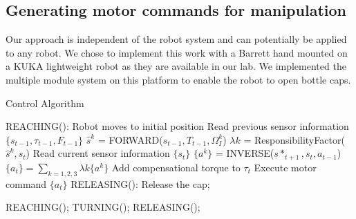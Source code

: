 

\subsection{Generating motor commands for manipulation}
\label{cha4:sec3:command}
Our approach is independent of the robot system and can potentially be applied to any robot. We chose to implement this work with a Barrett hand mounted on a KUKA lightweight robot as they are available in our lab. We implemented the multiple module system on this platform to enable the robot to open bottle caps.

\begin{algorithm}
  \caption{Control Algorithm}
  \begin{algorithmic}[1]
    \State REACHING(): Robot moves to initial position\;
          \State Read previous sensor information $\{s_{t-1},\tau_{t-1},F_{t-1}\}$\;
            \State $\hat{s}^{k}$ = FORWARD($s_{t-1},T_{t-1},\Omega_I^k$) \;
          \EndFor
            \State $\lambda{k}$ = ResponsibilityFactor($\hat{s}^{k},s_t$) \;
          \EndFor
          \State Read current sensor information $\{s_{t}\}$\;
            \State $\{a^k\}$ = INVERSE($s*_{t+1},s_t,a_{t-1}$) \;
          \EndFor
          \State $\{a_t\} = \sum_{k=1,2,3}\lambda{k}\{a^k\}$\;\;
          \State Add compensational torque to $\tau_t$\;
          \State Execute motor command $\{a_t\}$ \;
          \State RELEASING(): Release the cap;
        \EndFunction
    \EndFor

        \State REACHING();
        \State TURNING();
        \State RELEASING();
    \EndWhile

  \end{algorithmic}
  \label{code:control}
\end{algorithm}


